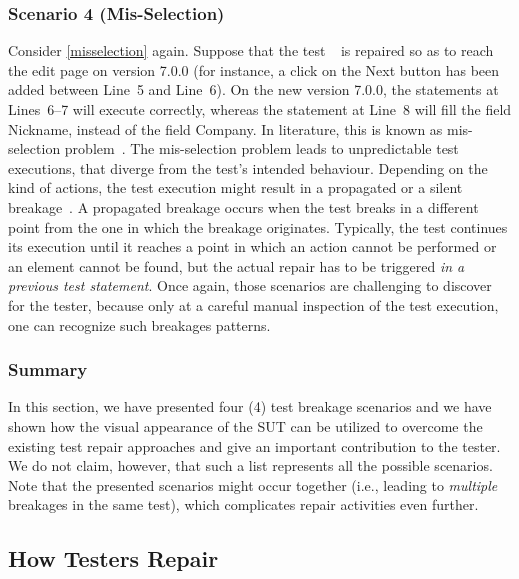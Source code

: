\subsubsection{Scenario 4 (Mis-Selection)} 
Consider \autoref{misselection} again. 
Suppose that the test~\textcircled{} is repaired so as to reach the edit page on version 7.0.0 (for instance, a click on the Next button has been added between Line~5 and Line~6). On the new version 7.0.0, the statements at Lines~6--7 will execute correctly, whereas the statement at Line~8 will fill the field Nickname, instead of the field Company. In literature, this is known as mis-selection problem~\cite{Choudhary:2011:WWA:2002931.2002935}. %
The mis-selection problem leads to unpredictable test executions, that diverge from the test's intended behaviour. Depending on the kind of actions, the test execution might result in a propagated or a silent breakage~\cite{Hammoudi-2016-ICST}. A propagated breakage occurs when the test breaks in a different point from the one in which the breakage originates. Typically, the test continues its execution until it reaches a point in which an action cannot be performed or an element cannot be found, but the actual repair has to be triggered \textit{in a previous test statement}. Once again, those scenarios are challenging to discover for the tester, because only at a careful manual inspection of the test execution, one can recognize such breakages patterns.

\subsubsection{Summary}
In this section, we have presented four (4) test breakage scenarios and we have shown how the visual appearance of the SUT can be utilized to overcome the existing test repair approaches and give an important contribution to the tester. We do not claim, however, that such a list represents all the possible scenarios. Note that the presented scenarios might occur together (i.e., leading to \textit{multiple} breakages in the same test), which complicates repair activities even further.


\subsection{How Testers Repair}

